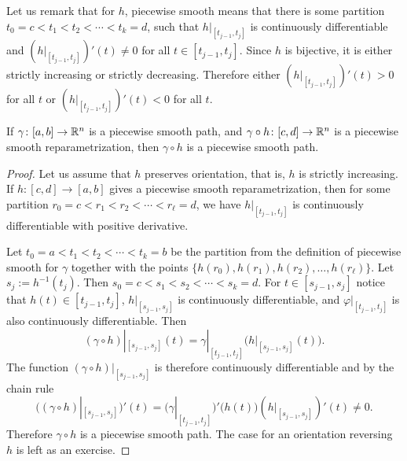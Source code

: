 Let us remark that for $h$, piecewise smooth means that there is
some partition $t_0 = c < t_1 < t_2 < \cdots < t_k = d$,
such that $h|_{[t_{j-1},t_j]}$ is continuously differentiable
and $(h|_{[t_{j-1},t_j]})'(t) \not= 0$ for all $t \in [t_{j-1},t_j]$.
Since $h$ is bijective, it is either strictly increasing or
strictly decreasing.  Therefore either $(h|_{[t_{j-1},t_j]})'(t) > 0$
for all $t$ or $(h|_{[t_{j-1},t_j]})'(t) < 0$ for all $t$.


\begin{prop} \label{prop:reparamapiecewisesmooth}
If $\gamma \colon [a,b] \to {\mathbb{R}}^n$ is a piecewise smooth path,
and $\gamma \circ h \colon [c,d] \to {\mathbb{R}}^n$ is
a piecewise smooth reparametrization, then $\gamma \circ h$
is a piecewise smooth path.
\end{prop}

\begin{proof}
Let us assume that $h$ preserves orientation, that is, $h$ is strictly
increasing.
If $h \colon [c,d] \to [a,b]$ gives a piecewise smooth reparametrization,
then for some partition
$r_0 = c < r_1 < r_2 < \cdots < r_\ell = d$, we have
$h|_{[t_{j-1},t_j]}$ is continuously differentiable with positive
derivative.


Let $t_0 = a < t_1 < t_2 < \cdots < t_k = b$ be the partition from the
definition of piecewise smooth for $\gamma$ together with the 
points $\{ h(r_0), h(r_1), h(r_2), \ldots, h(r_\ell) \}$.
Let $s_j := h^{-1}(t_j)$.  Then
$s_0 = c < s_1 < s_2 < \cdots < s_k = d$.
For $t \in [s_{j-1},s_j]$ notice that $h(t) \in [t_{j-1},t_j]$,
$h|_{[s_{j-1},s_j]}$ is continuously differentiable, and
$\varphi|_{[t_{j-1},t_j]}$ is also continuously differentiable.
Then
\begin{equation*}
(\gamma \circ h)|_{[s_{j-1},s_{j}]} (t)
=
\gamma|_{[t_{j-1},t_{j}]} \bigl( h|_{[s_{j-1},s_j]}(t) \bigr) .
\end{equation*}
The function 
$(\gamma \circ h)|_{[s_{j-1},s_{j}]}$ is therefore continuously
differentiable and
by the chain rule
\begin{equation*}
\bigl( (\gamma \circ h)|_{[s_{j-1},s_{j}]} \bigr) ' (t)
=
\bigl( \gamma|_{[t_{j-1},t_{j}]} \bigr)' \bigl( h(t) \bigr)
(h|_{[s_{j-1},s_j]})'(t) \not= 0 .
\end{equation*}
Therefore $\gamma \circ h$ is a piecewise smooth path.  The case for an
orientation reversing $h$ is left as an exercise.
\end{proof}

